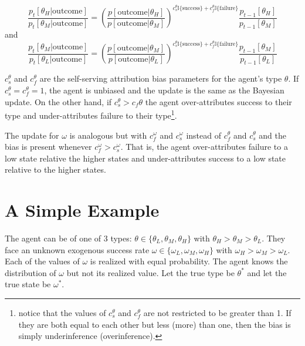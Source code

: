 \documentclass[
  12pt,
]{article}
\begin{document}
\begin{equation}
\frac{p_{t}[\theta_H|\text{outcome}]}{p_{t}[\theta_M|\text{outcome}]} = 
      \left(\frac{p[\text{outcome}|\theta_H]}{p[\text{outcome}|\theta_M]}\right)^{c_s^{\theta}\mathbb{I}\{\text{success}\}+c_f^{\theta}\mathbb{I}\{\text{failure}\}}\frac{p_{t-1}[\theta_H]}{p_{t-1}[\theta_M]}
\end{equation} and \begin{equation}
\frac{p_{t}[\theta_M|\text{outcome}]}{p_{t}[\theta_L|\text{outcome}]} = 
      \left(\frac{p[\text{outcome}|\theta_M]}{p[\text{outcome}|\theta_L]}\right)^{c_s^{\theta}\mathbb{I}\{\text{success}\}+c_f^{\theta}\mathbb{I}\{\text{failure}\}}\frac{p_{t-1}[\theta_M]}{p_{t-1}[\theta_L]}
\end{equation}

\(c_s^{\theta}\) and \(c_f^{\theta}\) are the self-serving attribution
bias parameters for the agent's type \(\theta\). If
\(c_s^{\theta} = c_f^{\theta} = 1\), the agent is unbiased and the
update is the same as the Bayesian update. On the other hand, if
\(c_s^{\theta} > c_f{\theta}\) the agent over-attributes success to
their type and under-attributes failure to their type\footnote{
  notice that the values of $c_s^{\theta}$ and $c_f^{\theta}$ are not restricted to be greater than 1. If they are both equal to 
  each other but less (more) than one, then the bias is simply underinference (overinference).}.

The update for \(\omega\) is analogous but with \(c_f^{\omega}\) and
\(c_s^{\omega}\) instead of \(c_f^{\theta}\) and \(c_s^{\theta}\) and
the bias is present whenever \(c_f^{\omega} > c_s^{\omega}\). That is,
the agent over-attributes failure to a low state relative the higher
states and under-attributes success to a low state relative to the
higher states.

\hypertarget{a-simple-example}{%
\section{A Simple Example}\label{a-simple-example}}

The agent can be of one of 3 types:
\(\theta \in \{\theta_L, \theta_M, \theta_H\}\) with
\(\theta_H > \theta_M > \theta_L\). They face an unknown exogenous
success rate \(\omega \in \{\omega_L, \omega_M, \omega_H\}\) with
\(\omega_H>\omega_M>\omega_L\). Each of the values of \(\omega\) is
realized with equal probability. The agent knows the distribution of
\(\omega\) but not its realized value. Let the true type be \(\theta^*\)
and let the true state be \(\omega^*\).
\end{document}
